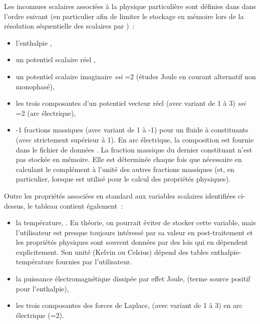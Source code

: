 Les  inconnues scalaires associ\'ees \`a la physique
particuli\`ere sont d\'efinies dans  dans l'ordre
suivant (en particulier afin de limiter le stockage en m\'emoire lors de
la r\'esolution s\'equentielle des
scalaires par )~:
\begin{itemize}
\item l'enthalpie ,
\item un potentiel scalaire r\'eel ,
\item un potentiel scalaire imaginaire  {\it ssi}
          =2 (\'etudes Joule en courant alternatif non monophas\'e),
\item les trois composantes d'un potentiel vecteur r\'eel
           (avec  variant de 1 \`a 3) {\it ssi}
        =2 (arc \'electrique),
\item {}-1 fractions massiques 
        (avec  variant de 1 \`a -1) pour un fluide \`a 
        constituants (avec  strictement sup\'erieur \`a 1).
        En arc \'electrique, la composition est fournie dans le fichier de donn\'ees
        . La fraction massique du
        dernier constituant n'est pas stock\'ee en m\'emoire. Elle est
        d\'etermin\'ee chaque fois que n\'ecessaire en calculant le compl\'ement \`a l'unit\'e
        des autres fractions massiques (et, en particulier, lorsque  est
        utilis\'e pour le calcul des propri\'et\'es physiques).
\end{itemize}

\bigskip
Outre les propri\'et\'es associ\'ees en standard aux variables scalaires
identifi\'ees ci-dessus, le
tableau  contient \'egalement~:
 \begin{itemize}
\item la temp\'erature, . En th\'eorie, on
        pourrait \'eviter de stocker cette variable, mais l'utilisateur est
        presque toujours int\'eress\'e par sa valeur en post-traitement et
        les propri\'et\'es physiques sont souvent donn\'ees par des lois qui en
        d\'ependent explicitement.
        Son unit\'e (Kelvin ou Celsius) d\'epend des tables
        enthalpie-temp\'erature fournies par l'utilisateur.
\item la puissance \'electromagn\'etique dissip\'ee par effet Joule,
         (terme source positif pour l'enthalpie),
\item les trois composantes des forces de Laplace,
         (avec  variant de 1 \`a 3)
        en arc \'electrique (=2).
\end{itemize}

